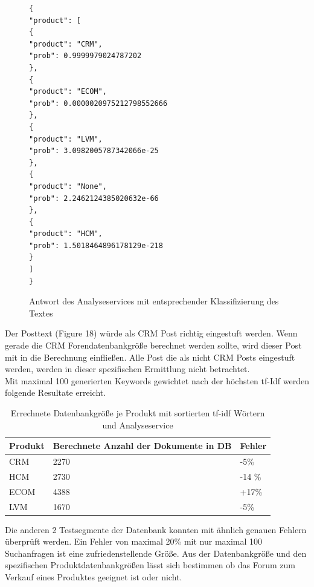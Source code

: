 \newpage

\begin{figure}[h!]
\begin{lstlisting}[language=HTML5]
{
"product": [
{
"product": "CRM",
"prob": 0.9999979024787202
},
{
"product": "ECOM",
"prob": 0.0000020975212798552666
},
{
"product": "LVM",
"prob": 3.0982005787342066e-25
},
{
"product": "None",
"prob": 2.2462124385020632e-66
},
{
"product": "HCM",
"prob": 1.5018464896178129e-218
}
]
}
\end{lstlisting}
\caption{Antwort des Analyseservices mit entsprechender Klassifizierung des Textes}
\end{figure}

Der Posttext (Figure 18) würde als CRM Post richtig eingestuft werden. Wenn gerade die CRM Forendatenbankgröße berechnet werden sollte, wird dieser Post mit in die Berechnung einfließen. Alle Post die als nicht CRM Posts eingestuft werden, werden in dieser spezifischen Ermittlung nicht betrachtet.\\
Mit maximal 100 generierten Keywords gewichtet nach der höchsten tf-Idf werden folgende Resultate erreicht.

\begin{table}
\begin{tabular}{ | p{3cm} | l | l |}
\hline
Produkt & Berechnete Anzahl der Dokumente in DB & Fehler \\ \hline
CRM & 2270 & -5\% \\ \hline
HCM & 2730 & -14 \% \\ \hline
ECOM & 4388 & +17\% \\ \hline
LVM & 1670 & -5\% \\ \hline
\end{tabular}
\caption{Errechnete Datenbankgröße je Produkt mit sortierten tf-idf Wörtern und Analyseservice}
\end{table}

Die anderen 2 Testsegmente der Datenbank konnten mit ähnlich genauen Fehlern überprüft werden.
Ein Fehler von maximal 20\% mit nur maximal 100 Suchanfragen ist eine zufriedenstellende Größe. Aus der Datenbankgröße und den spezifischen Produktdatenbankgrößen lässt sich bestimmen ob das Forum zum Verkauf eines Produktes geeignet ist oder nicht.

